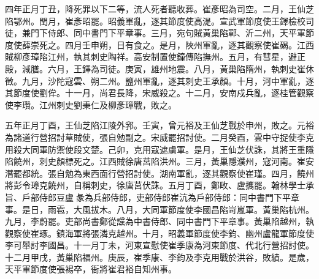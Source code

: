 \begin{pinyinscope}
 四年正月丁丑，降死罪以下二等，流人死者聽收葬。崔彥昭為司空。二月，王仙芝陷鄂州。閏月，崔彥昭罷。昭義軍亂，逐其節度使高湜。宣武軍節度使王鐸檢校司徒，兼門下侍郎、同中書門下平章事。三月，宛句賊黃巢陷鄆、沂二州，天平軍節度使薛崇死之。四月壬申朔，日有食之。是月，陜州軍亂，逐其觀察使崔碣。江西賊柳彥璋陷江州，執其刺史陶祥。高安制置使鐘傳陷撫州。五月，有彗星，避正殿，減膳。六月，王鐸為司徒。庚寅，雄州地震。八月，黃巢陷隋州，執刺史崔休徵。九月，沙陀寇雲、朔二州。鹽州軍亂，逐其刺史王承顏。十月，河中軍亂，逐其節度使劉侔。十一月，尚君長降，宋威殺之。十二月，安南戍兵亂，逐桂管觀察使李瓚。江州刺史劉秉仁及柳彥璋戰，敗之。



 五年正月丁酉，王仙芝陷江陵外郛。壬寅，曾元裕及王仙芝戰於申州，敗之。元裕為諸道行營招討草賊使，張自勉副之。宋威罷招討使。二月癸酉，雲中守捉使李克用殺大同軍防禦使段文楚。己卯，克用寇遮虜軍。是月，王仙芝伏誅，其將王重隱陷饒州，刺史顏標死之。江西賊徐唐莒陷洪州。三月，黃巢隱濮州，寇河南。崔安潛罷都統。張自勉為東西面行營招討使。湖南軍亂，逐其觀察使崔瑾。四月，饒州將彭令璋克饒州，自稱刺史，徐唐莒伏誅。五月丁酉，鄭畋、盧攜罷。翰林學士承旨、戶部侍郎豆盧彖為兵部侍郎，吏部侍郎崔沆為戶部侍郎：同中書門下平章事。是日，雨雹，大風拔木。八月，大同軍節度使李國昌陷岢嵐軍。黃巢陷杭州。九月，李蔚罷。吏部尚書鄭從讜為中書侍郎、同中書門下平章事。黃巢陷越州，執觀察使崔琢。鎮海軍將張潾克越州。十月，昭義軍節度使李鈞、幽州盧龍軍節度使李可舉討李國昌。十一月丁未，河東宣慰使崔季康為河東節度、代北行營招討使。十二月甲戌，黃巢陷福州。庚辰，崔季康、李鈞及李克用戰於洪谷，敗績。是歲，天平軍節度使張裼卒，衙將崔君裕自知州事。




\end{pinyinscope}
